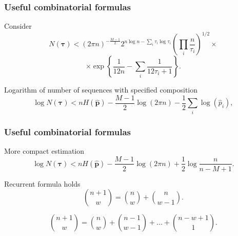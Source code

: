 \documentclass[14pt]{beamer}
\renewcommand{\vec}[1]{\ensuremath{\boldsymbol{#1}}}
\begin{document}
\begin{frame}
\frametitle{Useful combinatorial formulas}
\begin{itemize}    
\small{    
    
    
    \item Consider
    \[
    N(\vec \tau) < (2\pi n)^{ - \frac{M - 1}{2}}2^{n\log n -
    \sum\limits_i {\tau _i \log \tau _i } }\left( {\prod\limits_i
    {\frac{n}{\tau _i }} } \right)^{1 / 2}\times
    \]
    \begin{equation}
    \label{eq3_10} \times \exp \left\{ {\frac{1}{12n} - \sum\limits_i
    {\frac{1}{12\tau _i + 1}} } \right\}.
    \end{equation}
    
    \item Logarithm of number of sequences with specified composition
    \begin{equation}
    \label{eq3_11} \log N(\vec \tau) < nH(\vec {\hat p}) - \frac{M -1}{2}\log (2\pi n) - \frac{1}{2}\sum\limits_i {\log (\hat {p}_i )} ,
    \end{equation}
}
\end{itemize}
\end{frame}


\begin{frame}
\frametitle{Useful combinatorial formulas}
\begin{itemize}    
\small{
    
    \item More compact estimation
    \begin{equation}
    \label{eq3_12} \log N(\vec \tau) < nH(\vec {\hat p}) - \frac{M - 1}{2}\log (2\pi n) + \frac{1}{2}\log \frac{n}{n - M + 1}.
    \end{equation}
    
    \item Recurrent formula holds
    \begin{equation}
    \label{eq3_13} \binom {n+1} w =\binom n w+\binom n {w-1} .
    \end{equation}
    
    \item 
    \begin{equation}
    \label{eq3_14} \binom {n+1} w =\binom n w+ \binom {n-1} {w-1} + ... + \binom {n-w+1} 1.
    \end{equation}
} 
\end{itemize}
\end{frame}
    
\end{document}
